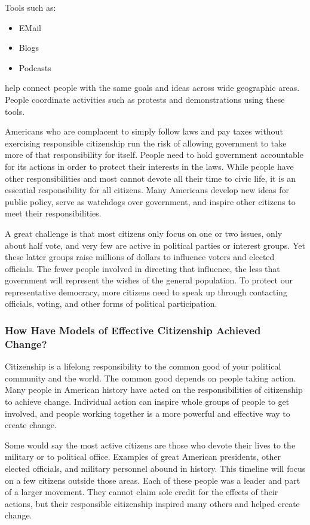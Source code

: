 Tools such as:

\begin{itemize}
    \item EMail
    \item Blogs
    \item Podcasts
\end{itemize}

help connect people with the same goals and ideas across wide geographic areas.
People coordinate activities such as protests and demonstrations using these
tools.

Americans who are complacent to simply follow laws and pay taxes without
exercising responsible citizenship run the risk of allowing government to take
more of that responsibility for itself. People need to hold government
accountable for its actions in order to protect their interests in the laws.
While people have other responsibilities and most cannot devote all their time
to civic life, it is an essential responsibility for all citizens. Many
Americans develop new ideas for public policy, serve as watchdogs over
government, and inspire other citizens to meet their responsibilities.

A great challenge is that most citizens only focus on one or two issues, only
about half vote, and very few are active in political parties or interest
groups. Yet these latter groups raise millions of dollars to influence voters
and elected officials. The fewer people involved in directing that influence,
the less that government will represent the wishes of the general population.
To protect our representative democracy, more citizens need to speak up through
contacting officials, voting, and other forms of political participation.

\subsubsection*{How Have Models of Effective Citizenship Achieved Change?}

Citizenship is a lifelong responsibility to the common good of your political
community and the world. The common good depends on people taking action. Many
people in American history have acted on the responsibilities of citizenship to
achieve change. Individual action can inspire whole groups of people to get
involved, and people working together is a more powerful and effective way to
create change.

Some would say the most active citizens are those who devote their lives to the
military or to political office. Examples of great American presidents, other
elected officials, and military personnel abound in history. This timeline will
focus on a few citizens outside those areas. Each of these people was a leader
and part of a larger movement. They cannot claim sole credit for the effects of
their actions, but their responsible citizenship inspired many others and
helped create change.

